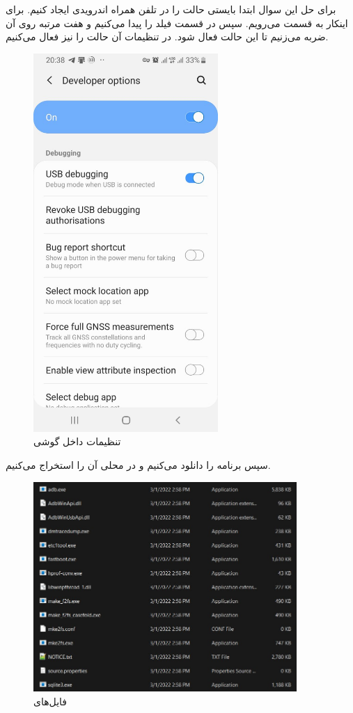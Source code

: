 \Problem
{}
{
برای حل این سوال ابتدا بایستی حالت
را در تلفن همراه اندرویدی ایجاد کنیم.
برای اینکار به قسمت
می‌رویم.
سپس در قسمت
فیلد
را پیدا می‌کنیم و هفت مرتبه روی آن ضربه می‌زنیم تا این حالت فعال شود.
در تنظیمات آن حالت
را نیز فعال می‌کنیم.
\begin{figure}[H]
    \includegraphics[width=7cm]{Images/Android.jpg}
    \centering
    \caption{تنظیمات داخل گوشی}
\end{figure}
\newpage
سپس برنامه
را دانلود می‌کنیم و در محلی آن را استخراج می‌کنیم.
\begin{figure}[H]
    \includegraphics[width=10cm]{Images/adb.jpg}
    \centering
    \caption{فایل‌های }
\end{figure}

}
